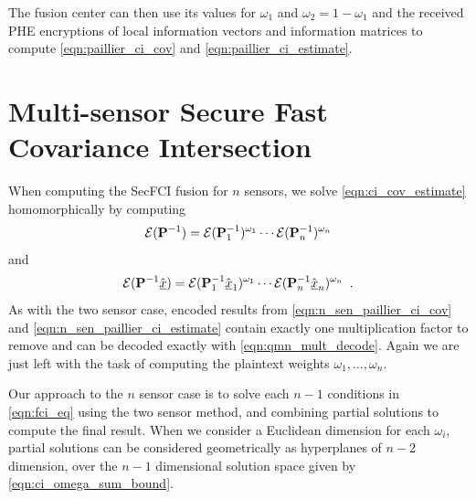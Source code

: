 \documentclass[letterpaper, 10 pt, journal, twoside]{ieeetran}  %
\begin{document}
The fusion center can then use its values for $\omega_1$ and $\omega_2 = 1-\omega_1$ and the received PHE encryptions of local information vectors and information matrices to compute \eqref{eqn:paillier_ci_cov} and \eqref{eqn:paillier_ci_estimate}.




\section{Multi-sensor Secure Fast Covariance Intersection} \label{sec:multi_secfci}
When computing the SecFCI fusion for $n$ sensors, we solve \eqref{eqn:ci_cov_estimate} homomorphically by computing
\begin{equation}
   \mathcal{E}({{\mathbf{P}}}^{-1}) = \mathcal{E}({{\mathbf{P}}}^{-1}_1)^{\omega_1}\cdots\mathcal{E}({{\mathbf{P}}}^{-1}_n)^{\omega_n} \label{eqn:n_sen_paillier_ci_cov}
\end{equation}
and
\begin{equation}
   \mathcal{E}({{\mathbf{P}}}^{-1}\hat{{\underline{x}}}) = \mathcal{E}({{\mathbf{P}}}^{-1}_1\hat{{\underline{x}}}_1)^{\omega_1}\cdots\mathcal{E}({{\mathbf{P}}}^{-1}_n\hat{{\underline{x}}}_n)^{\omega_n}\enspace. \label{eqn:n_sen_paillier_ci_estimate}
\end{equation}
As with the two sensor case, encoded results from \eqref{eqn:n_sen_paillier_ci_cov} and \eqref{eqn:n_sen_paillier_ci_estimate} contain exactly one multiplication factor to remove and can be decoded exactly with \eqref{eqn:qmn_mult_decode}. Again we are just left with the task of computing the plaintext weights $\omega_1,\dots,\omega_n$.

Our approach to the $n$ sensor case is to solve each $n-1$ conditions in \eqref{eqn:fci_eq} using the two sensor method, and combining partial solutions to compute the final result. When we consider a Euclidean dimension for each $\omega_i$, partial solutions can be considered geometrically as hyperplanes of $n-2$ dimension, over the $n-1$ dimensional solution space given by \eqref{eqn:ci_omega_sum_bound}. 
\end{document}
